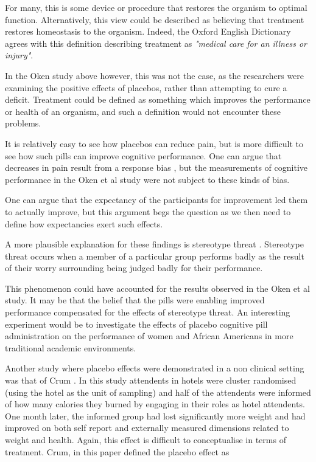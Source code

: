 For many, this is some device or procedure that restores the organism to optimal function. Alternatively, this view could be described as believing that treatment restores homeostasis to the organism. Indeed, the Oxford English Dictionary agrees with this definition describing treatment as \textit{"medical care for an illness or injury"}.

In the Oken study above however, this was not the case, as the researchers were examining the positive effects of placebos, rather than attempting to cure a deficit. Treatment could be defined as something which improves the performance or health of an organism, and such a definition would not encounter these problems.

It is relatively easy to see how placebos can reduce pain, but is more difficult to see how such pills can improve cognitive performance. One can argue that decreases in pain result from a response bias \cite{Allan2002}, but the measurements of cognitive performance in the Oken et al study were not subject to these kinds of bias. 

 One can argue that the expectancy of the participants for improvement led them to actually improve, but this argument begs the question as we then need to define how expectancies exert such effects. 

A more plausible explanation for these findings is stereotype threat \cite{schmader2003converging,spencerclaude1999stereotype}. Stereotype threat occurs when a member of a particular group performs badly as the result of their worry surrounding being judged badly for their performance. 

This phenomenon could have accounted for the results observed in the Oken et al study.  It may be that the belief that the pills were enabling improved performance compensated for the effects of stereotype threat. An interesting experiment would be to investigate the effects of placebo cognitive pill administration on the performance of women and African Americans in more traditional academic environments.  

Another study where placebo effects were demonstrated in a non clinical setting was that of Crum \cite{Crum2007}. In this study attendents in hotels were cluster randomised (using the hotel as the unit of sampling) and half of the attendents were informed of how many calories they burned by engaging in their roles as hotel attendents. One month later, the informed group had lost significantly more weight and had improved on both self report and externally measured dimensions related to weight and health. Again, this effect is difficult to conceptualise in terms of treatment.  Crum, in this paper defined the placebo effect as

